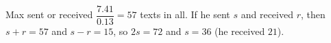 Max sent or received $\dfrac{7.41}{0.13}=57$ texts in all. If he sent $s$ and received $r$, then $s+r=57$ and $s-r=15$, so $2s=72$ and $s=\boxed{36}$ (he received $21$).
